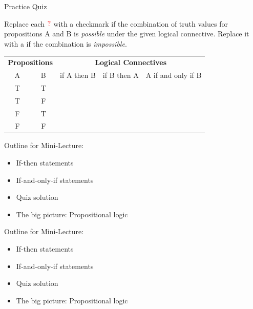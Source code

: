 \documentclass[10pt]{beamer}
\begin{document}
\begin{frame}{Practice Quiz}

Replace each $\color{red}{?} \color{black}$ with a checkmark \greencheck if the combination of truth values for propositions A and B is \textit{possible} under the given logical connective.  Replace it with a \redx if the combination is \textit{impossible}.

\begin{table}
\centering
\begin{tabular}{cc|ccc}
\multicolumn{2}{c}{\textbf{Propositions}} & \multicolumn{3}{c}{\textbf{Logical Connectives}} \\
A  & B & if A then B & if B then A & A if and only if B \\
\hline 
T & T & \red{?} & \red{?} & \red{?}\\
T & F &\red{?}  & \red{?} & \red{?} \\
F & T & \red{?} & \red{?} & \red{?} \\
F & F & \red{?} &\red{?}  & \red{?}
\end{tabular}
\end{table}

\pause 
\begin{center}
\end{center}

\end{frame}


\begin{frame}[standout]
Outline for Mini-Lecture:
\begin{itemize}
\item \textbullet \quad If-then statements
\item \textbullet \quad If-and-only-if statements
\item \textbullet \quad Quiz solution
\item \textbullet \quad The big picture: Propositional logic
\end{itemize}

\end{frame}

\begin{frame}[standout]
Outline for Mini-Lecture:
\begin{itemize}
\item \alert{\textbullet \quad If-then statements}
\item \textbullet \quad If-and-only-if statements
\item \textbullet \quad Quiz solution
\item \textbullet \quad The big picture: Propositional logic
\end{itemize}

\end{frame}
\end{document}
